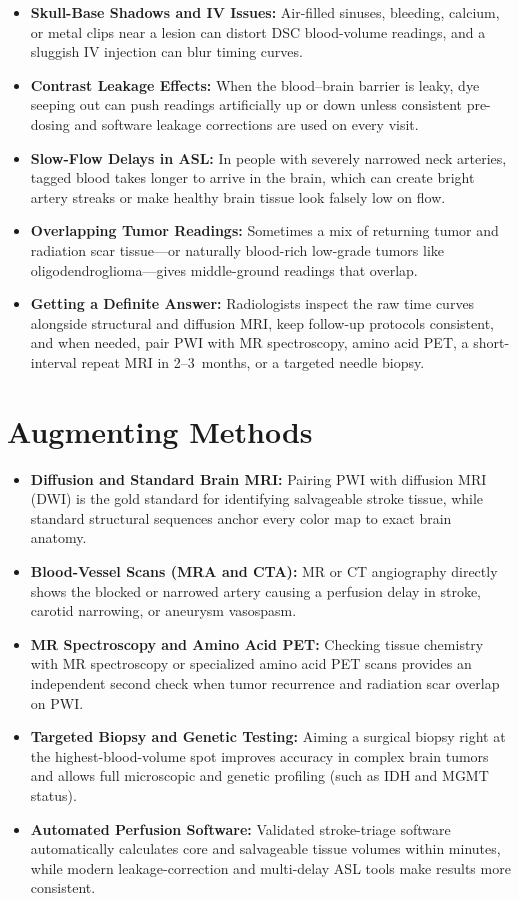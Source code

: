 \begin{itemize}
    \item \textbf{Skull-Base Shadows and IV Issues:} Air-filled sinuses, bleeding, calcium, or metal clips near a lesion can distort DSC blood-volume readings, and a sluggish IV injection can blur timing curves.
    \item \textbf{Contrast Leakage Effects:} When the blood--brain barrier is leaky, dye seeping out can push readings artificially up or down unless consistent pre-dosing and software leakage corrections are used on every visit.
    \item \textbf{Slow-Flow Delays in ASL:} In people with severely narrowed neck arteries, tagged blood takes longer to arrive in the brain, which can create bright artery streaks or make healthy brain tissue look falsely low on flow.
    \item \textbf{Overlapping Tumor Readings:} Sometimes a mix of returning tumor and radiation scar tissue---or naturally blood-rich low-grade tumors like oligodendroglioma---gives middle-ground readings that overlap.
    \item \textbf{Getting a Definite Answer:} Radiologists inspect the raw time curves alongside structural and diffusion MRI, keep follow-up protocols consistent, and when needed, pair PWI with MR spectroscopy, amino acid PET, a short-interval repeat MRI in 2--3~months, or a targeted needle biopsy.
\end{itemize}

\section{Augmenting Methods}

\begin{itemize}
    \item \textbf{Diffusion and Standard Brain MRI:} Pairing PWI with diffusion MRI (DWI) is the gold standard for identifying salvageable stroke tissue, while standard structural sequences anchor every color map to exact brain anatomy.
    \item \textbf{Blood-Vessel Scans (MRA and CTA):} MR or CT angiography directly shows the blocked or narrowed artery causing a perfusion delay in stroke, carotid narrowing, or aneurysm vasospasm.
    \item \textbf{MR Spectroscopy and Amino Acid PET:} Checking tissue chemistry with MR spectroscopy or specialized amino acid PET scans provides an independent second check when tumor recurrence and radiation scar overlap on PWI.
    \item \textbf{Targeted Biopsy and Genetic Testing:} Aiming a surgical biopsy right at the highest-blood-volume spot improves accuracy in complex brain tumors and allows full microscopic and genetic profiling (such as IDH and MGMT status).
    \item \textbf{Automated Perfusion Software:} Validated stroke-triage software automatically calculates core and salvageable tissue volumes within minutes, while modern leakage-correction and multi-delay ASL tools make results more consistent.
\end{itemize}


